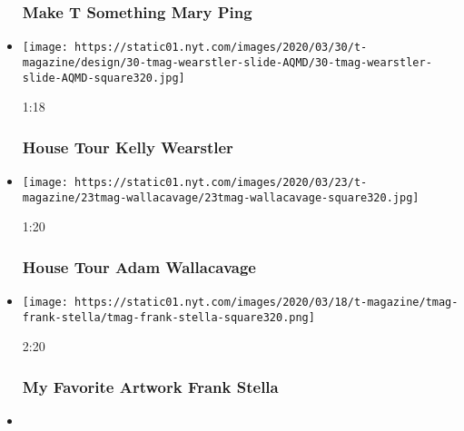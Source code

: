 \begin{itemize}
  \hypertarget{make-t-something--mary-ping}{%
  \subsubsection{Make T Something \textbar{} Mary
  Ping}\label{make-t-something--mary-ping}}
\item
  \href{https://www.nytimes.com/video/t-magazine/design/100000007053619/house-tour-kelly-wearstler.html?action=click\&module=video-series-bar\&region=header\&pgtype=Article\&playlistId=video/t-magazine}{}

  \texttt{[image: https://static01.nyt.com/images/2020/03/30/t-magazine/design/30-tmag-wearstler-slide-AQMD/30-tmag-wearstler-slide-AQMD-square320.jpg]}

  1:18

  \hypertarget{house-tour--kelly-wearstler}{%
  \subsubsection{House Tour \textbar{} Kelly
  Wearstler}\label{house-tour--kelly-wearstler}}
\item
  \href{https://www.nytimes.com/video/t-magazine/100000007038918/house-tour-adam-wallacavage.html?action=click\&module=video-series-bar\&region=header\&pgtype=Article\&playlistId=video/t-magazine}{}

  \texttt{[image: https://static01.nyt.com/images/2020/03/23/t-magazine/23tmag-wallacavage/23tmag-wallacavage-square320.jpg]}

  1:20

  \hypertarget{house-tour--adam-wallacavage}{%
  \subsubsection{House Tour \textbar{} Adam
  Wallacavage}\label{house-tour--adam-wallacavage}}
\item
  \href{https://www.nytimes.com/video/t-magazine/100000007025848/my-favorite-artwork-frank-stella.html?action=click\&module=video-series-bar\&region=header\&pgtype=Article\&playlistId=video/t-magazine}{}

  \texttt{[image: https://static01.nyt.com/images/2020/03/18/t-magazine/tmag-frank-stella/tmag-frank-stella-square320.png]}

  2:20

  \hypertarget{my-favorite-artwork--frank-stella}{%
  \subsubsection{My Favorite Artwork \textbar{} Frank
  Stella}\label{my-favorite-artwork--frank-stella}}
\item
  \href{https://www.nytimes.com/video/t-magazine/100000007006059/make-t-something-katie-stout.html?action=click\&module=video-series-bar\&region=header\&pgtype=Article\&playlistId=video/t-magazine}{}


\end{itemize}
